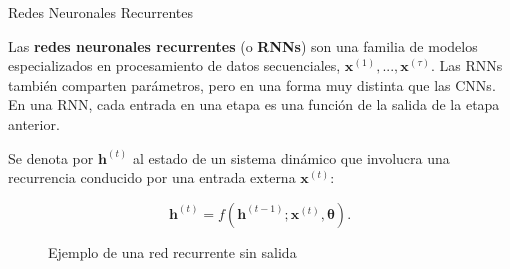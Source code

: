 \documentclass[handout, 9pt]{beamer}
\begin{document}
\begin{frame}{Redes Neuronales Recurrentes}

Las \textbf{redes neuronales recurrentes} (o \textbf{RNNs}) son una familia de modelos especializados en procesamiento de datos secuenciales, $\bm{x}^{(1)},...,\bm{x}^{(\tau)}$. Las RNNs también comparten parámetros, pero en una forma muy distinta que las CNNs. En una RNN, cada entrada en una etapa es una función de la salida de la etapa anterior. \pause

Se denota por $\bm{h}^{(t)}$ al estado de un sistema din\'amico que involucra una recurrencia conducido por una entrada externa $\bm{x}^{(t)}$:

\begin{equation*}
\bm{h}^{(t)} = f(\bm{h}^{(t-1)}; \bm{x}^{(t)}, \bm{\theta}).
\end{equation*}
\pause

\begin{figure}[H]
\captionsetup{font=small,labelfont=small}
\caption{Ejemplo de una red recurrente sin salida \cite{Goodfellow-et-al-2016}}
\centering
{}
\end{figure}

\end{frame}
\end{document}
